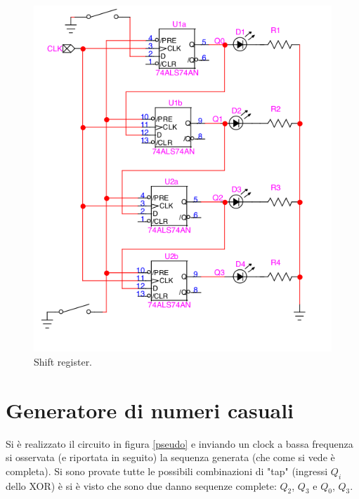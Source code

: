 \documentclass[10pt,a4paper]{article}
\begin{document}
\begin{figure}
\centering
\includegraphics[scale=0.5]{shift.png}
\caption{Shift register.\label{shift}}
\end{figure}

\section{Generatore di numeri casuali}
Si è realizzato il circuito in figura \ref{pseudo} e inviando un clock a bassa frequenza si osservata (e riportata in seguito) la sequenza generata (che come si vede è completa). Si sono provate tutte le possibili combinazioni di "tap" (ingressi $Q_i$ dello XOR) è si è visto che sono due danno sequenze complete: $Q_2$, $Q_3$ e $Q_0$, $Q_3$.

\end{document}
